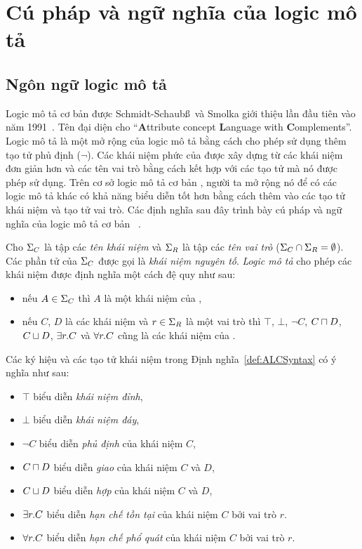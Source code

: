 \section{Cú pháp và ngữ nghĩa của logic mô tả}
\label{sec:Chap1.SyntaxSemantic}
\subsection{Ngôn ngữ logic mô tả \ALC}
\label{sec:Chap1.ALCLanguage}
Logic mô tả cơ bản \ALC được Schmidt-Schaub\ss~và Smolka giới thiệu lần đầu tiên vào năm 1991~\cite{Schmidt1991}. Tên \ALC đại diện cho ``\textbf{A}ttribute concept \textbf{L}anguage with \textbf{C}omplements''. Logic mô tả \ALC là một mở rộng của logic mô tả \AL bằng cách cho phép sử dụng thêm tạo tử phủ định ($\neg$). 
%
Các khái niệm phức của \ALC được xây dựng từ các khái niệm đơn giản hơn và các tên vai trò bằng cách kết hợp với các tạo tử mà nó được phép sử dụng. Trên cơ sở logic mô tả cơ bản \ALC, người ta mở rộng nó để có các logic mô tả khác có khả năng biểu diễn tốt hơn bằng cách thêm vào các tạo tử khái niệm và tạo tử vai trò.
Các định nghĩa sau đây trình bày cú pháp và ngữ nghĩa của logic mô tả cơ bản \ALC~\cite{Lehmann2006,Lehmann2010}.

\begin{Definition}
\label{def:ALCSyntax}
Cho $\Sigma_C$ là tập các {\em tên khái niệm} và $\Sigma_R$ là tập các {\em tên vai trò} ($\Sigma_C \cap \Sigma_R = \emptyset$). Các phần tử của $\Sigma_C$ được gọi là {\em khái niệm nguyên tố}. {\em Logic mô tả} \ALC cho phép các khái niệm được định nghĩa một cách đệ quy như sau:
\begin{itemize}
	\item nếu $A \in \Sigma_C$ thì $A$ là một khái niệm của \ALC,
	\item nếu $C$, $D$ là các khái niệm và $r \in \Sigma_R$ là một vai trò thì $\top$, $\bot$, $\neg C$, $C \sqcap D$, $C \sqcup D$, $\exists r.C$ và $\forall r.C$ cũng là các khái niệm của \ALC.\myend
\end{itemize}
\end{Definition}
%
\noindent
Các ký hiệu và các tạo tử khái niệm trong Định nghĩa~\ref{def:ALCSyntax} có ý nghĩa như sau:
\begin{itemize}
	\item $\top$ biểu diễn {\em khái niệm đỉnh},
	\item $\bot$ biểu diễn {\em khái niệm đáy},
	\item $\neg C$ biểu diễn {\em phủ định} của khái niệm $C$,
	\item $C \sqcap D$ biểu diễn {\em giao} của khái niệm $C$ và $D$,
	\item $C \sqcup D$ biểu diễn {\em hợp} của khái niệm $C$ và $D$,
	\item $\exists r.C$ biểu diễn {\em hạn chế tồn tại} của khái niệm $C$ bởi vai trò $r$.
	\item $\forall r.C$ biểu diễn {\em hạn chế phổ quát} của khái niệm $C$ bởi vai trò $r$.
\end{itemize}

